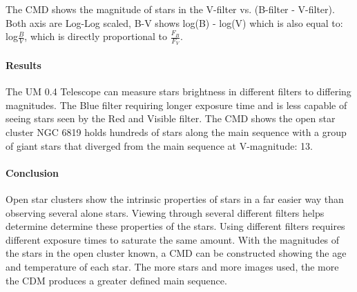 \documentclass[11pt,twocolumn]{article}
\begin{document}
The CMD shows the magnitude of stars in the V-filter vs. (B-filter - V-filter). Both axis are Log-Log scaled, B-V shows log(B) - log(V) which is also equal to: log$\frac{B}{V}$, which is directly proportional to $\frac{F_B}{F_V}$. 

\paragraph{Results}

The UM 0.4 Telescope can measure stars brightness in different filters to differing magnitudes. The Blue filter requiring longer exposure time and is less capable of seeing stars seen by the Red and Visible filter. The CMD shows the open star cluster NGC 6819 holds hundreds of stars along the main sequence with a group of giant stars that diverged from the main sequence at V-magnitude: 13.

\paragraph{Conclusion}

Open star clusters show the intrinsic properties of stars in a far easier way than observing several alone stars. Viewing through several different filters helps determine determine these properties of the stars. Using different filters requires different exposure times to saturate the same amount. With the magnitudes of the stars in the open cluster known, a CMD can be constructed showing the age and temperature of each star. The more stars and more images used, the more the CDM produces a greater defined main sequence.
\end{document}
